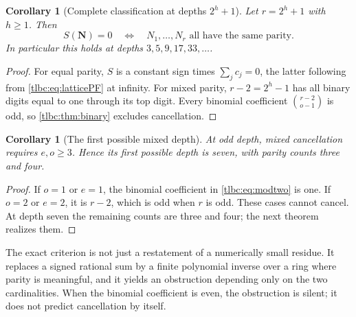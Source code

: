 \documentclass[11pt,letterpaper]{article}
\numberwithin{equation}{section}
\newtheorem{corollary}[theorem]{Corollary}
\theoremstyle{definition}\newtheorem{definition}[theorem]{Definition}
\theoremstyle{remark}\newtheorem{remark}[theorem]{Remark}
\begin{document}
\begin{corollary}[Complete classification at depths $2^h+1$]\label{tlbc:cor:dyadic}
Let $r=2^h+1$ with $h\ge1$. Then
\begin{equation}\label{tlbc:eq:dyadic}
 S(\boldsymbol N)=0
 \quad\Longleftrightarrow\quad
 N_1,\ldots,N_r\text{ all have the same parity}.
\end{equation}
In particular this holds at depths $3,5,9,17,33,\ldots$.
\end{corollary}
\begin{proof}
For equal parity, $S$ is a constant sign times $\sum_jc_j=0$, the latter following from \eqref{tlbc:eq:latticePF} at infinity. For mixed parity, $r-2=2^h-1$ has all binary digits equal to one through its top digit. Every binomial coefficient $\binom{r-2}{o-1}$ is odd, so \cref{tlbc:thm:binary} excludes cancellation.
\end{proof}

\begin{corollary}[The first possible mixed depth]\label{tlbc:cor:firstdepth}
At odd depth, mixed cancellation requires $e,o\ge3$. Hence its first possible depth is seven, with parity counts three and four.
\end{corollary}
\begin{proof}
If $o=1$ or $e=1$, the binomial coefficient in \eqref{tlbc:eq:modtwo} is one. If $o=2$ or $e=2$, it is $r-2$, which is odd when $r$ is odd. These cases cannot cancel. At depth seven the remaining counts are three and four; the next theorem realizes them.
\end{proof}

The exact criterion is not just a restatement of a numerically small residue. It replaces a signed rational sum by a finite polynomial inverse over a ring where parity is meaningful, and it yields an obstruction depending only on the two cardinalities. When the binomial coefficient is even, the obstruction is silent; it does not predict cancellation by itself.
\end{document}
